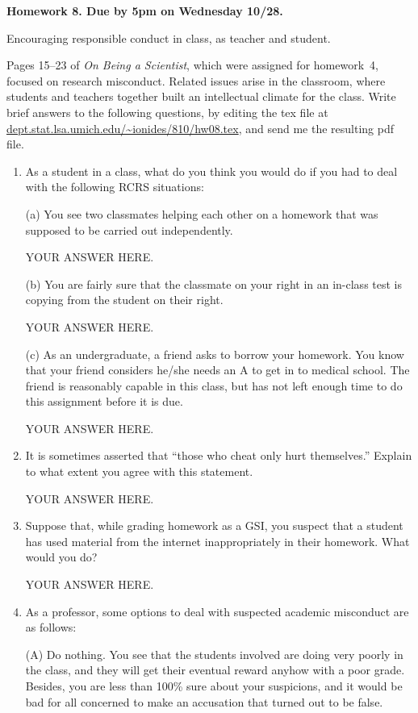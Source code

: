 \documentclass[12pt]{article}
\begin{document}
\begin{center}\bf
Homework 8. Due by 5pm on Wednesday 10/28.

Encouraging responsible conduct in class, as teacher and student.

\end{center}
Pages 15--23 of {\em On Being a Scientist}, which were assigned for homework~4, focused on research misconduct.  Related issues arise in the classroom, where students and teachers together built an intellectual climate for the class. Write brief answers to the following questions, by editing the tex file at \url{dept.stat.lsa.umich.edu/~ionides/810/hw08.tex}, and send me the resulting pdf file. 

\begin{enumerate}

\item As a student in a class, what do you think you would do if you had to deal with the following RCRS situations:

(a) You see two classmates helping each other on a homework that was supposed to be carried out independently.

YOUR ANSWER HERE.

(b) You are fairly sure that the classmate on your right in an in-class test is copying from the student on their right.

YOUR ANSWER HERE.

(c) As an undergraduate, a friend asks to borrow your homework. You know that your friend considers he/she needs an A to get in to medical school. The friend is reasonably capable in this class, but has not left enough time to do this assignment before it is due.

YOUR ANSWER HERE.

\item It is sometimes asserted that ``those who cheat only hurt themselves.'' Explain to what extent you agree with this statement.

YOUR ANSWER HERE.

\item Suppose that, while grading homework as a GSI, you suspect that a student has used material from the internet inappropriately in their homework. What would you do?

YOUR ANSWER HERE.

\item As a professor, some options to deal with suspected academic misconduct are as follows:

(A) Do nothing. You see that the students involved are doing very poorly in the class, and they will get their eventual reward anyhow with a poor grade. Besides, you are less than 100\% sure about your suspicions, and it would be bad for all concerned to make an accusation that turned out to be false.


\end{enumerate}
\end{document}
